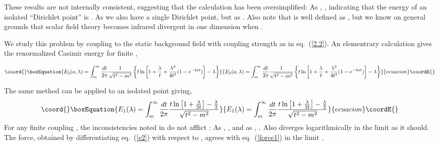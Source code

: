\documentclass[a4paper,aps,amsfonts,prl,showpacs,nobibnotes,nofootinbib,%
tightenlines,twocolumn]{revtex4}
\begin{document}
These results are not internally consistent, suggesting that the 
calculation has been oversimplified:  As \coordHE{},
\coordHE{}, indicating that the energy of an isolated
``Dirichlet point'' is \coordHE{}.  As \coordHE{} we also have a single
Dirichlet point, but \coordHE{} as \coordHE{}. 
Also note that \coordHE{} is well defined as \coordHE{}, but
we know on general grounds that scalar field theory becomes infrared
divergent in one dimension when \coordHE{}.

We study this problem by coupling \coordHE{} to the static background
field \coordHE{} with coupling strength
\myHighlight{$\lambda$}\coordHE{} as in eq.~(\ref{2.2}).  An elementrary calculation gives the
renormalized Casimir energy for finite \myHighlight{$\lambda$}\coordHE{},
%
\begin{widetext}\vspace*{-\bigskipamount}
\begin{equation}\coord{}\boxEquation{
E_2(a,\lambda)=\int_m^{\infty}\frac{dt}{2\pi}\frac{1}
{\sqrt{t^2-m^2}}\left\{ t \ln \left[
1+\frac{\lambda}{t}+\frac{\lambda^2} {4t^2}(1-e^{-4at})\right] -
\lambda\right\}
\label{e2}
}{
E_2(a,\lambda)=\int_m^{\infty}\frac{dt}{2\pi}\frac{1}
{\sqrt{t^2-m^2}}\left\{ t \ln \left[
1+\frac{\lambda}{t}+\frac{\lambda^2} {4t^2}(1-e^{-4at})\right] -
\lambda\right\}
}{ecuacion}\coordE{}\end{equation}
\end{widetext}

The same method can be applied to an isolated point giving,
%
\begin{equation}\coord{}\boxEquation{
    E_{1}(\lambda) =  \int_{m}^{\infty}\frac{dt}{2\pi}
    \frac{t\ln\left[1+\frac{\lambda}{2t}\right]
    -\frac{\lambda}{2}}{\sqrt{t^{2}-m^{2}}}
}{
    E_{1}(\lambda) =  \int_{m}^{\infty}\frac{dt}{2\pi}
    \frac{t\ln\left[1+\frac{\lambda}{2t}\right]
    -\frac{\lambda}{2}}{\sqrt{t^{2}-m^{2}}}
}{ecuacion}\coordE{}\end{equation}
%
For any finite coupling \myHighlight{$\lambda$}\coordHE{}, the inconsistencies noted in
\coordHE{} do not afflict \coordHE{}: As
\coordHE{}, \coordHE{}, and as \coordHE{},
\coordHE{}.  Also \coordHE{}
diverges logarithmically in the limit \coordHE{} as it should.  The
force, obtained by differentiating eq.~(\ref{e2}) with respect to
\coordHE{}, agrees with eq.~(\ref{force1}) in the limit \myHighlight{$\lambda \to
\infty$}\coordHE{}.
\end{document}
